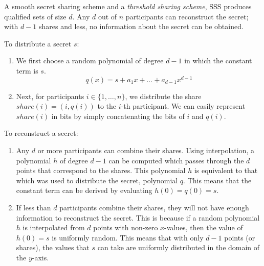 \begin{definition} \label{def:sss}
 A smooth secret sharing scheme and a \textit{threshold sharing scheme}, SSS produces qualified sets 
 of size $d$. Any $d$ out of $n$ participants can reconstruct the secret; with $d-1$ shares and less, 
 no information about the secret can be obtained.

 To distribute a secret $s$:
\begin{enumerate}
    \item We first choose a random polynomial of degree $d - 1$ in which the constant term is $s$. 
    $$
    q(x) = s + a_1x + \ldots + a_{d-1}x^{d-1}
    $$
    \item Next, for participants $i \in \{1, \ldots, n\}$, we distribute the share $share(i) = (i, q(i))$ 
    to the $i$-th participant. We can easily represent $share(i)$ in bits by simply concatenating 
    the bits of $i$ and $q(i)$.
\end{enumerate}

To reconstruct a secret:
\begin{enumerate}
    \item Any $d$ or more participants can combine their shares. Using interpolation, a
    polynomial $h$ of degree $d - 1$ can be computed which passes through the $d$ points that 
    correspond to the shares. This polynomial $h$ is equivalent to that which was used to 
    distribute the secret, polynomial $q$. This means that the constant term can be derived by 
    evaluating $h(0) = q(0) = s$.
    \item If less than $d$ participants combine their shares, they will not have enough information 
    to reconstruct the secret. This is because if a random polynomial $h$ is interpolated from 
    $d$ points with non-zero $x$-values, then the value of $h(0) = s$ is uniformly random. This means
    that with only $d-1$ points (or shares), the values that $s$ can take are uniformly distributed
    in the domain of the $y$-axis. 
\end{enumerate}
\end{definition}

